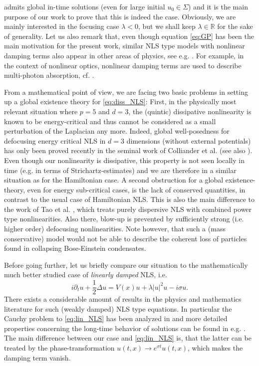 \documentclass[a4paper,leqno]{amsart}
\theoremstyle{plain}
\theoremstyle{definition}
\numberwithin{equation}{section}
\begin{document}
admits global in-time solutions (even for large initial $u_0 \in \Sigma$) and it is the main purpose of our work to prove
that this is indeed the case. Obviously, we are mainly interested in the focusing case $\lambda < 0$,
but we shall keep $\lambda \in {{\mathbb R}}$ for the sake of
generality. Let us also remark that, even though equation \eqref{eq:GP} has been the main motivation for the 
present work, similar NLS type models with nonlinear damping terms also appear in other areas of 
physics, see e.g. \cite{Bi, PSS, PeSt, SaMa}. For example, in the context of nonlinear optics, nonlinear damping terms are used to describe 
multi-photon absorption, cf. \cite{Fi}.

From a mathematical point of view, we are facing two basic problems in setting up a global existence theory for \eqref{eq:diss_NLS}: 
First, in the physically most relevant
situation where $p=5$ and $d=3$, the (quintic) dissipative nonlinearity is known to be energy-critical \cite{Caz, T} and thus cannot
be considered as a small perturbation of the Laplacian any more. Indeed, global well-posedness for defocusing energy critical NLS
in $d=3$ dimensions (without external potentials) has only been proved recently in the seminal work of Colliander et al. \cite{CKSTT} (see also \cite{KiVi}). 
Even though our nonlinearity is dissipative, this property is not seen locally in time (e.g. in terms of Strichartz-estimates) and we are therefore 
in a similar situation as for the Hamiltonian case. 
A second obstruction for a global existence-theory, even for energy sub-critical cases, is the lack of conserved quantities, 
in contrast to the usual case of Hamiltonian NLS. This is also the main difference to the work of Tao et al. \cite{TVZ}, which treats purely dispersive 
NLS with combined power type nonlinearities. Also there, blow-up is prevented by sufficiently strong (i.e. higher order) defocusing nonlinearities. Note however, 
that such a (mass conservative) model would not be able to describe the coherent loss of particles found in collapsing Bose-Einstein condensates.

Before going further, let us briefly compare our situation to the mathematically much better studied case of \emph{linearly damped} NLS, i.e. 
\begin{equation}\label{eq:lin_NLS}
i{\partial}_t u + {\frac{1}{2}}\Delta u  = V(x) u + \lambda|u |^2 u - i\sigma u.
\end{equation}
There exists a considerable amount of results in the physics and
mathematics literature for such (weakly damped) NLS type equations. In particular the Cauchy problem to \eqref{eq:lin_NLS} has been analyzed in \cite{OT, Ts1} and more detailed
properties concerning the long-time behavior of solutions can be found in e.g. \cite{Fi, Go, La}. The main difference between our case and \eqref{eq:lin_NLS} is,
that the latter can be treated by the phase-transformation $u(t,x) \to e^{\sigma t} u(t,x)$, which makes the damping term vanish.
\end{document}
